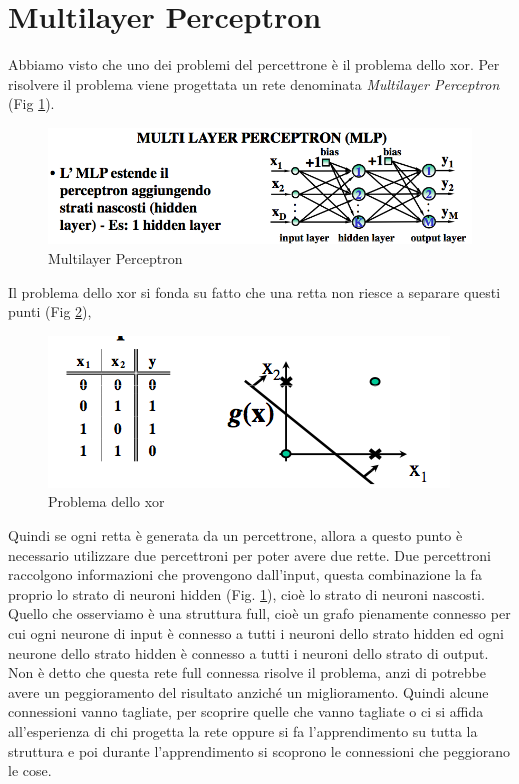 \section{Multilayer Perceptron}
\noindent Abbiamo visto che uno dei problemi del percettrone è il problema dello xor. Per risolvere il problema viene progettata un rete denominata \emph{Multilayer Perceptron} (Fig \ref{mp}).
\begin{figure}
\centering
\includegraphics[scale=0.6]{img/mp.png}
\caption{Multilayer Perceptron}
\label{mp}
\end{figure}
Il problema dello xor si fonda su fatto che una retta non riesce a separare questi punti (Fig \ref{xor}),
\begin{figure}
\centering
\includegraphics[scale=0.6]{img/xor.png}
\caption{Problema dello xor}
\label{xor}
\end{figure}
Quindi se ogni retta è generata da un percettrone, allora a questo punto  è necessario utilizzare due percettroni per poter avere due rette. Due percettroni raccolgono informazioni che provengono dall'input, questa combinazione la fa proprio lo strato di neuroni hidden (Fig. \ref{mp}), cioè lo strato di neuroni nascosti. Quello che osserviamo è una struttura full, cioè un grafo pienamente connesso per cui ogni neurone di input è connesso a tutti i neuroni dello strato hidden ed ogni neurone dello strato hidden è connesso a tutti i neuroni dello strato di output. Non è detto che questa rete full connessa risolve il problema, anzi di potrebbe avere un peggioramento del risultato anziché un miglioramento. Quindi alcune connessioni vanno tagliate, per scoprire quelle che vanno tagliate o ci si affida all'esperienza di chi progetta la rete oppure si fa l'apprendimento su tutta la struttura e poi durante l'apprendimento si scoprono le connessioni che peggiorano le cose. \\

